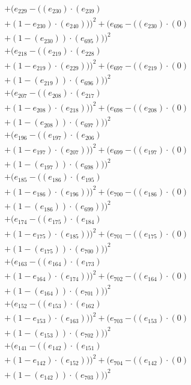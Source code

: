 \documentclass[10pt, a4paper]{article}
\begin{document}
\begin{align*}
& + (e_{229} - ((e_{230})  \cdot  (e_{239}) \\
& + (1 - e_{230})  \cdot  (e_{240})))^{2} + (e_{696} - ((e_{230}) \cdot (0) \\
& + (1 - (e_{230})) \cdot (e_{695})))^{2} \\
& + (e_{218} - ((e_{219})  \cdot  (e_{228}) \\
& + (1 - e_{219})  \cdot  (e_{229})))^{2} + (e_{697} - ((e_{219}) \cdot (0) \\
& + (1 - (e_{219})) \cdot (e_{696})))^{2} \\
& + (e_{207} - ((e_{208})  \cdot  (e_{217}) \\
& + (1 - e_{208})  \cdot  (e_{218})))^{2} + (e_{698} - ((e_{208}) \cdot (0) \\
& + (1 - (e_{208})) \cdot (e_{697})))^{2} \\
& + (e_{196} - ((e_{197})  \cdot  (e_{206}) \\
& + (1 - e_{197})  \cdot  (e_{207})))^{2} + (e_{699} - ((e_{197}) \cdot (0) \\
& + (1 - (e_{197})) \cdot (e_{698})))^{2} \\
& + (e_{185} - ((e_{186})  \cdot  (e_{195}) \\
& + (1 - e_{186})  \cdot  (e_{196})))^{2} + (e_{700} - ((e_{186}) \cdot (0) \\
& + (1 - (e_{186})) \cdot (e_{699})))^{2} \\
& + (e_{174} - ((e_{175})  \cdot  (e_{184}) \\
& + (1 - e_{175})  \cdot  (e_{185})))^{2} + (e_{701} - ((e_{175}) \cdot (0) \\
& + (1 - (e_{175})) \cdot (e_{700})))^{2} \\
& + (e_{163} - ((e_{164})  \cdot  (e_{173}) \\
& + (1 - e_{164})  \cdot  (e_{174})))^{2} + (e_{702} - ((e_{164}) \cdot (0) \\
& + (1 - (e_{164})) \cdot (e_{701})))^{2} \\
& + (e_{152} - ((e_{153})  \cdot  (e_{162}) \\
& + (1 - e_{153})  \cdot  (e_{163})))^{2} + (e_{703} - ((e_{153}) \cdot (0) \\
& + (1 - (e_{153})) \cdot (e_{702})))^{2} \\
& + (e_{141} - ((e_{142})  \cdot  (e_{151}) \\
& + (1 - e_{142})  \cdot  (e_{152})))^{2} + (e_{704} - ((e_{142}) \cdot (0) \\
& + (1 - (e_{142})) \cdot (e_{703})))^{2} \\

\end{align*}
\end{document}
